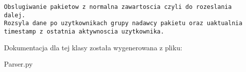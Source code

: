 \footnotesize\begin{verbatim}Obslugiwanie pakietow z normalna zawartoscia czyli do rozeslania dalej.
Rozsyla dane po uzytkownikach grupy nadawcy pakietu oraz uaktualnia timestamp z ostatnia aktywnoscia uzytkownika.         
\end{verbatim}
\normalsize
 

Dokumentacja dla tej klasy została wygenerowana z pliku:\begin{CompactItemize}
\item 
Parser.py\end{CompactItemize}
